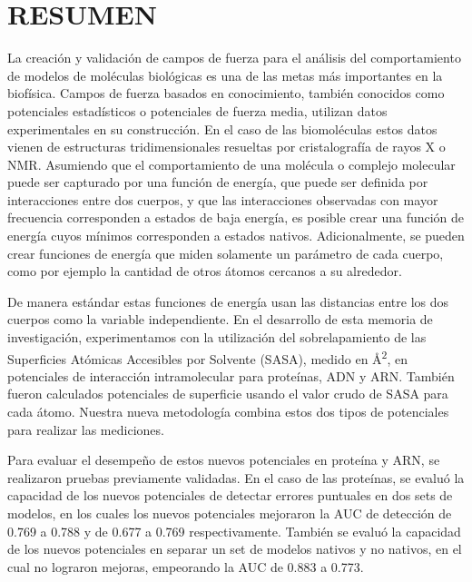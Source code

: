 \newpage
\section*{RESUMEN}
\begin{singlespace}
\par
La creación y validación de campos de fuerza para el análisis del comportamiento de modelos de moléculas biológicas es una de las metas más importantes en la biofísica. 
Campos de fuerza basados en conocimiento, también conocidos como potenciales estadísticos o potenciales de fuerza media, utilizan datos experimentales en su construcción. 
En el caso de las biomoléculas estos datos vienen de estructuras tridimensionales resueltas por cristalografía de rayos X o NMR.
Asumiendo que el comportamiento de una molécula o complejo molecular puede ser capturado por una función de energía, que puede ser definida por interacciones entre dos cuerpos, y que las interacciones observadas con mayor frecuencia corresponden a estados de baja energía, es posible crear una función de energía cuyos mínimos corresponden a estados nativos.
Adicionalmente, se pueden crear funciones de energía que miden solamente un parámetro de cada cuerpo, como por ejemplo la cantidad de otros átomos cercanos a su alrededor.
\\
\par
De manera estándar estas funciones de energía usan las distancias entre los dos cuerpos como la variable independiente. 
En el desarrollo de esta memoria de investigación, experimentamos con la utilización del sobrelapamiento de las Superficies Atómicas Accesibles por Solvente (SASA), medido en \si{\angstrom}\textsuperscript{2}, en potenciales de interacción intramolecular para proteínas, ADN y ARN. 
También fueron calculados potenciales de superficie usando el valor crudo de SASA para cada átomo.
Nuestra nueva metodología combina estos dos tipos de potenciales para realizar las mediciones.
\\
\par
Para evaluar el desempeño de estos nuevos potenciales en proteína y ARN, se realizaron pruebas previamente validadas. 
En el caso de las proteínas, se evaluó la capacidad de los nuevos potenciales de detectar errores puntuales en dos sets de modelos, en los cuales los nuevos potenciales mejoraron la AUC de detección de 0.769 a 0.788 y de 0.677 a 0.769 respectivamente. 
También se evaluó la capacidad de los nuevos potenciales en separar un set de modelos nativos y no nativos, en el cual no lograron mejoras, empeorando la AUC de 0.883 a 0.773. 

\end{singlespace}

